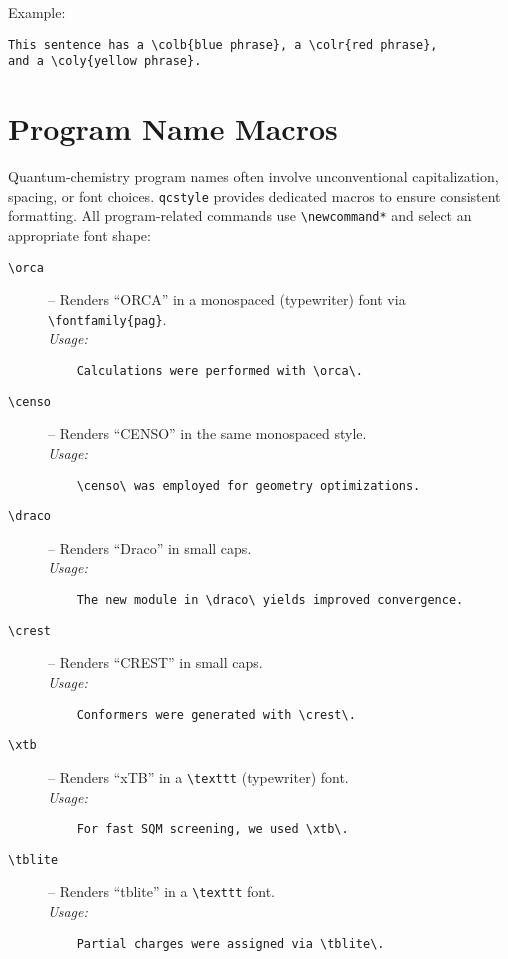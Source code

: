 \documentclass[a4paper,12pt]{article}
\begin{document}
\noindent Example:
\begin{verbatim}
This sentence has a \colb{blue phrase}, a \colr{red phrase}, 
and a \coly{yellow phrase}.
\end{verbatim}

\section{Program Name Macros}
\label{sec:programs}
Quantum-chemistry program names often involve unconventional capitalization, spacing, or font choices. \texttt{qcstyle} provides dedicated macros to ensure consistent formatting. All program-related commands use \verb|\newcommand*| and select an appropriate font shape:

\begin{description}
  \item[\texttt{\textbackslash orca}]  – Renders “ORCA” in a monospaced (typewriter) font via \verb|\fontfamily{pag}|.\\
    \textit{Usage:} 
    \begin{verbatim}
    Calculations were performed with \orca\.
    \end{verbatim}

  \item[\texttt{\textbackslash censo}] – Renders “CENSO” in the same monospaced style.\\
    \textit{Usage:} 
    \begin{verbatim}
    \censo\ was employed for geometry optimizations.
    \end{verbatim}

    \item[\texttt{\textbackslash draco}] – Renders “Draco” in small caps.\\
    \textit{Usage:}
    \begin{verbatim}
    The new module in \draco\ yields improved convergence.
    \end{verbatim}

    \item[\texttt{\textbackslash crest}] – Renders “CREST” in small caps.\\
    \textit{Usage:}
    \begin{verbatim}
    Conformers were generated with \crest\.
    \end{verbatim}

    \item[\texttt{\textbackslash xtb}]   – Renders “xTB” in a \verb|\texttt| (typewriter) font.\\
    \textit{Usage:}
    \begin{verbatim}
    For fast SQM screening, we used \xtb\.
    \end{verbatim}

    \item[\texttt{\textbackslash tblite}] – Renders “tblite” in a \verb|\texttt| font.\\
    \textit{Usage:}
    \begin{verbatim}
    Partial charges were assigned via \tblite\.
    \end{verbatim}
\end{description}
\end{document}
